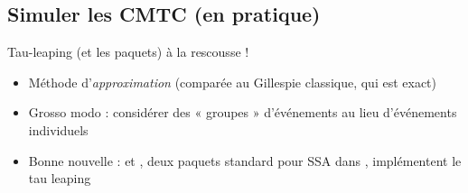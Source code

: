 \documentclass[aspectratio=169]{beamer}\usepackage[]{graphicx}\usepackage[]{xcolor}
\begin{document}

\subsection{Simuler les CMTC (en pratique)}

\begin{frame}{Tau-leaping (et les paquets) à la rescousse !}
    \begin{itemize}
        \item Méthode d'\emph{approximation} (comparée au Gillespie classique, qui est exact)
        \item Grosso modo : considérer des « groupes » d'événements au lieu d'événements individuels
        \item Bonne nouvelle :  et , deux paquets standard pour SSA dans , implémentent le tau leaping
    \end{itemize}
\end{frame}
\end{document}
